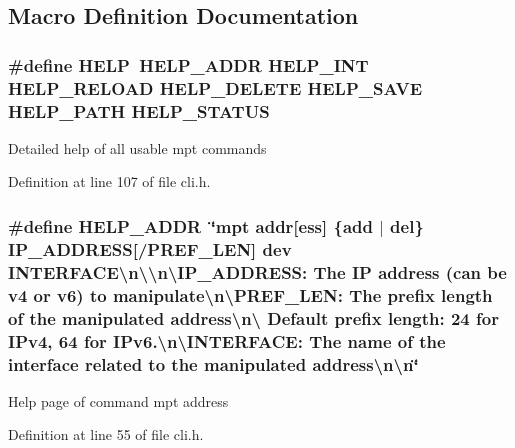 \subsection{Macro Definition Documentation}
\hypertarget{group___mpt_help_gae8a798ec5e0449028e485688e8241b5e}{
\subsubsection[{H\-E\-L\-P}]{\setlength{\rightskip}{0pt plus 5cm}\#define H\-E\-L\-P~{\bf H\-E\-L\-P\-\_\-\-A\-D\-D\-R} {\bf H\-E\-L\-P\-\_\-\-I\-N\-T} {\bf H\-E\-L\-P\-\_\-\-R\-E\-L\-O\-A\-D} {\bf H\-E\-L\-P\-\_\-\-D\-E\-L\-E\-T\-E} {\bf H\-E\-L\-P\-\_\-\-S\-A\-V\-E} {\bf H\-E\-L\-P\-\_\-\-P\-A\-T\-H} {\bf H\-E\-L\-P\-\_\-\-S\-T\-A\-T\-U\-S}}}\label{group___mpt_help_gae8a798ec5e0449028e485688e8241b5e}
Detailed help of all usable mpt commands 

Definition at line 107 of file cli.\-h.

\hypertarget{group___mpt_help_ga50c0df023791ae0a02efd91863d86efb}{
\subsubsection[{H\-E\-L\-P\-\_\-\-A\-D\-D\-R}]{\setlength{\rightskip}{0pt plus 5cm}\#define H\-E\-L\-P\-\_\-\-A\-D\-D\-R~\char`\"{}mpt addr\mbox{[}ess\mbox{]} \{add $|$ del\} I\-P\-\_\-\-A\-D\-D\-R\-E\-S\-S\mbox{[}/P\-R\-E\-F\-\_\-\-L\-E\-N\mbox{]} dev I\-N\-T\-E\-R\-F\-A\-C\-E\textbackslash{}n\textbackslash{}\textbackslash{}n\textbackslash{}\-I\-P\-\_\-\-A\-D\-D\-R\-E\-S\-S\-: The I\-P address (can be v4 or v6) to manipulate\textbackslash{}n\textbackslash{}\-P\-R\-E\-F\-\_\-\-L\-E\-N\-:   The prefix length of the manipulated address\textbackslash{}n\textbackslash{}                Default prefix length\-: 24 for I\-Pv4, 64 for I\-Pv6.\textbackslash{}n\textbackslash{}\-I\-N\-T\-E\-R\-F\-A\-C\-E\-:  The name of the interface related to the manipulated address\textbackslash{}n\textbackslash{}n\char`\"{}}}\label{group___mpt_help_ga50c0df023791ae0a02efd91863d86efb}
Help page of command mpt address 

Definition at line 55 of file cli.\-h.

